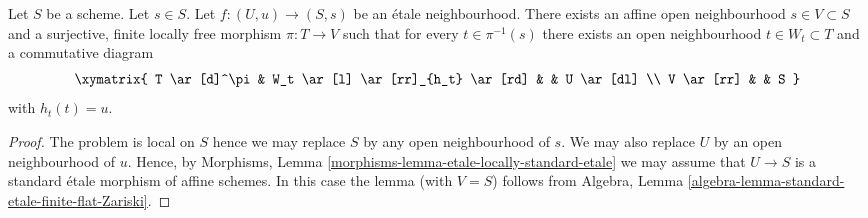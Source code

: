 \begin{lemma}
\label{lemma-dominate-etale-neighbourhood-finite-flat}
Let $S$ be a scheme. Let $s \in S$.
Let $f : (U, u) \to (S, s)$ be an \'etale neighbourhood.
There exists an affine open neighbourhood $s \in V \subset S$
and a surjective, finite locally free morphism $\pi : T \to V$
such that for every $t \in \pi^{-1}(s)$ there exists an
open neighbourhood $t \in W_t \subset T$ and a commutative
diagram
$$
\xymatrix{
T \ar[d]^\pi & W_t \ar[l] \ar[rr]_{h_t} \ar[rd] & & U \ar[dl] \\
V \ar[rr] & & S
}
$$
with $h_t(t) = u$.
\end{lemma}

\begin{proof}
The problem is local on $S$ hence we may replace $S$ by any
open neighbourhood of $s$.
We may also replace $U$ by an open neighbourhood of $u$.
Hence, by Morphisms, Lemma \ref{morphisms-lemma-etale-locally-standard-etale}
we may assume that
$U \to S$ is a standard \'etale morphism of affine schemes.
In this case the lemma (with $V = S$) follows from
Algebra, Lemma \ref{algebra-lemma-standard-etale-finite-flat-Zariski}.
\end{proof}
